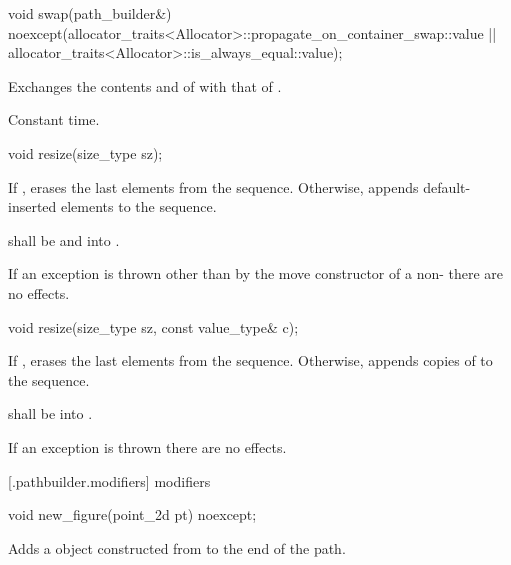 %
\begin{itemdecl}
void swap(path_builder&)
  noexcept(allocator_traits<Allocator>::propagate_on_container_swap::value ||
  allocator_traits<Allocator>::is_always_equal::value);
\end{itemdecl}
\begin{itemdescr}
\pnum
\effects
Exchanges the contents and
of
with that of .

\pnum
\complexity
Constant time.
\end{itemdescr}

%
\begin{itemdecl}
void resize(size_type sz);
\end{itemdecl}
\begin{itemdescr}
\pnum
\effects
If , erases the last  elements
from the sequence. Otherwise, appends  default-inserted 
elements to the sequence.

\pnum
\requires
{} shall be
 and  into .

\pnum
\remarks
If an exception is thrown other than by the move constructor of a 
non-
 there are no effects.
\end{itemdescr}

%
\begin{itemdecl}
void resize(size_type sz, const value_type& c);
\end{itemdecl}
\begin{itemdescr}
\pnum
\effects
If , erases the last  elements
from the sequence. Otherwise,
appends  copies of  to the sequence.

\pnum
\requires
{} shall be  into .

\pnum
\remarks
If an exception is thrown there are no effects.
\end{itemdescr}

 [\iotwod.pathbuilder.modifiers] { modifiers}

%
\begin{itemdecl}
void new_figure(point_2d pt) noexcept;
\end{itemdecl}
\begin{itemdescr}
\pnum
\effects
Adds a  object constructed from  to the end of the path.
\end{itemdescr}

